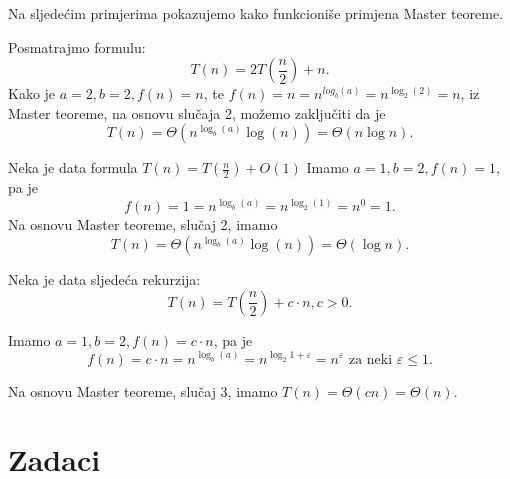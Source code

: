 Na sljedećim primjerima pokazujemo kako funkcioniše primjena Master teoreme. %
 

\begin{example}
	Posmatrajmo formulu:
	$$T(n) = 2T\left(\frac{n}{2}\right) + n.$$
	Kako je $a = 2, b = 2, f(n) = n$, te $f(n) = n = n^{log_b (a)} = n^{\log_2 (2)} = n$, iz Master teoreme, na osnovu slučaja 2,  možemo zaključiti da je 
	$$T(n) = \Theta (n^{\log_b (a)} \log (n)) = \Theta (n \log n).$$
\end{example}

\begin{example} Neka je data formula
	$T(n) = T(\frac{n}{2}) + O(1)$
	Imamo $a = 1, b = 2, f(n) = 1$, pa je $$f(n) = 1 = n^{\log_b (a)} = n^{\log_2 (1)} = n^{0} = 1.$$
	Na osnovu Master teoreme, slučaj 2, imamo
	$$T(n) = \Theta (n^{\log_b (a)} \log (n)) = \Theta (\log n).$$
\end{example}

\begin{example}
	Neka je data sljedeća rekurzija:
	$$T(n) = T\left(\frac{n}{2}\right) + c\cdot n, c >0.$$
	
	Imamo $a = 1, b = 2, f(n) = c \cdot n$, pa je 
	$$f(n) = c \cdot n = n^{\log_b (a)} = n^{\log_2 1 + \varepsilon} = n^{\varepsilon} \text{ za neki } \varepsilon \leq 1.$$
	
	Na osnovu Master teoreme, slučaj 3, imamo %
	$T(n)  = \Theta (cn) = \Theta(n).$
\end{example}

\section{Zadaci}

